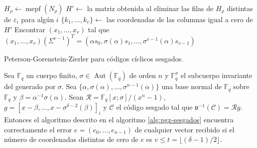 \begin{Ualgorithm}[htbp]
{    \(H_{\rho} \longleftarrow \operatorname{mepf}(N_{\rho})\)\;\label{algl:pgz-sesgados-mpec-Nrho}
    \(H' \longleftarrow\) la matriz obtenida al eliminar las filas de \(H_{\rho}\) distintas de \(\varepsilon_i\) para algún \(i\)\;\label{algl:pgz-sesgados-h-prima}
    \(\{k_1, \dots, k_v\} \longleftarrow\) las coordenadas de las columnas igual a cero de \(H'\)\;
  }
  Encontrar \((x_1, \dots, x_v)\) tal que \((x_1, \dots, x_v)(\Sigma^{v-1})^T = (\alpha s_0, \sigma(\alpha)s_1, \dots, \sigma^{v-1}(\alpha)s_{v-1})\)\;\label{algl:pgz-sesgados-solucion-sistema}
  \label{algl:pgz-sesgados-error}
  \caption{Peterson-Gorenstein-Zierler para códigos cíclicos sesgados.}
  \label{alg:pgz-sesgados}
\end{Ualgorithm}

\begin{theorem}
  Sea \(\mathbb F_q\) un cuerpo finito, \(\sigma \in \operatorname{Aut}(\mathbb F_q)\) de orden \(n\) y \(\mathbb F_q^{\sigma}\) el subcuerpo invariante del generado por \(\sigma\).
  Sea \(\{\alpha, \sigma(\alpha), \dots, \sigma^{n-1}(\alpha)\}\) una base normal de \(\mathbb F_q\) sobre \(\mathbb F_{q}\) y \(\beta = \alpha^{-1}\sigma(\alpha)\).
  Sean \(\mathcal R = \mathbb F_q[x; \sigma]/(x^n - 1)\), \(g = \left[x - \beta, \dots, x - \sigma^{\delta - 2}(\beta)\right]_{i}\) y \(\mathcal C\) el código  sesgado tal que \(\mathfrak v^{-1}(\mathcal C) = \mathcal Rg\).
  Entonces el algoritmo descrito en el algoritmo \ref{alg:pgz-sesgados} encuentra correctamente el error \(e = (e_0, \dots, e_{n-1})\) de cualquier vector recibido si el número de coordenadas distintas de cero de \(e\) es \(v \leq t = \lfloor (\delta - 1)/2 \rfloor\).
\end{theorem}

